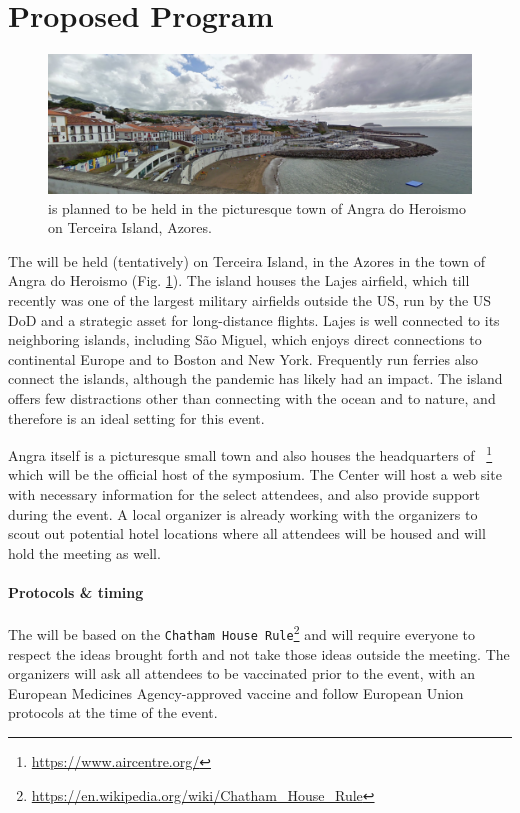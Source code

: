\section{Proposed Program}
\label{sec:pgm}

\begin{figure}[!h]
  \centering
  \includegraphics[scale=0.5]{fig/angra.png}
  \caption{\symp is planned to be held in the picturesque
    town of Angra do Heroismo on Terceira Island, Azores.}
  \label{fig:angra}
\end{figure}

The \symp will be held (tentatively) on Terceira Island, in the Azores
in the town of Angra do Heroismo (Fig. \ref{fig:angra}). The island
houses the Lajes airfield, which till recently was one of the largest
military airfields outside the US, run by the US DoD and a strategic
asset for long-distance flights. Lajes is well connected to its
neighboring islands, including S\~{a}o Miguel, which enjoys direct
connections to continental Europe and to Boston and New
York. Frequently run ferries also connect the islands, although the
pandemic has likely had an impact. The island offers few distractions
other than connecting with the ocean and to nature, and therefore is
an ideal setting for this event.

Angra itself is a picturesque small town and also houses the
headquarters of \aire~\footnote{\url{https://www.aircentre.org/}} which
will be the official host of the symposium. The Center will host a web
site with necessary information for the select attendees, and also
provide support during the event. A local organizer is already working
with the organizers to scout out potential hotel locations where all
attendees will be housed and will hold the meeting as well. 

\paragraph{Protocols \& timing} The \symp will be based on the
\texttt{Chatham House
  Rule}\footnote{\url{https://en.wikipedia.org/wiki/Chatham_House_Rule}}
and will require everyone to respect the ideas brought forth and not
take those ideas outside the meeting.  The organizers will ask all
attendees to be vaccinated prior to the event, with an European
Medicines Agency-approved vaccine and follow European Union protocols
at the time of the event.


